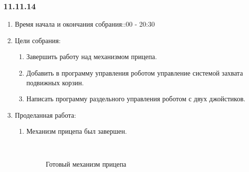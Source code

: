 
\subsubsection{11.11.14} 

\begin{enumerate} 
	\item Время начала и окончания собрания::00 - 20:30
	\item Цели собрания:\newline
	\begin{enumerate}
		\item Завершить работу над механизмом прицепа.\newline
		
		\item Добавить в программу управления роботом управление системой захвата подвижных корзин.\newline
		
		\item Написать программу раздельного управления роботом с двух джойстиков.\newline
		
	\end{enumerate}
	
	\item Проделанная работа:\newline
	\begin{enumerate}
		\item Механизм прицепа был завершен.\newline
		
		\begin{figure}[H]
			\begin{minipage}[h]{0.2\linewidth}
				\center  
			\end{minipage}
			\begin{minipage}[h]{0.6\linewidth}
				\caption{Готовый механизм прицепа}
			\end{minipage}
		\end{figure}
		

\end{enumerate}
\end{enumerate}
